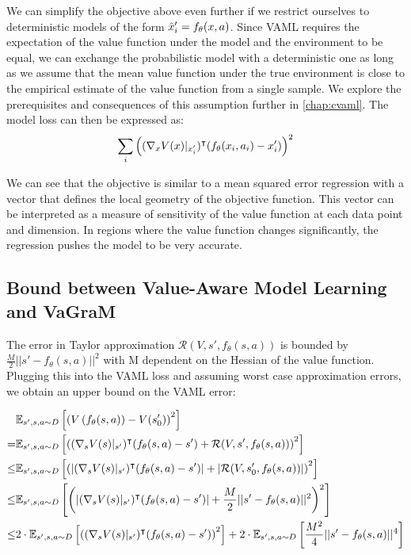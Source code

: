 We can simplify the objective above even further if we restrict ourselves to deterministic models of the form $\hat{x}'_i = f_\theta(x,a)$.
Since VAML requires the expectation of the value function under the model and the environment to be equal, we can exchange the probabilistic model with a deterministic one as long as we assume that the mean value function under the true environment is close to the empirical estimate of the value function from a single sample.
We explore the prerequisites and consequences of this assumption further in \autoref{chap:cvaml}.
The model loss can then be expressed as:
\begin{align}
    \sum_i {\left((\nabla_x V(x)|_{x'_i})^\intercal (f_\theta(x_i,a_i) - x'_i) \right)^2} \label{eq:vagram:taylor_vaml}
\end{align}

We can see that the objective is similar to a mean squared error regression with a vector that defines the local geometry of the objective function. This vector can be interpreted as a measure of sensitivity of the value function at each data point and dimension. In regions where the value function changes significantly, the regression pushes the model to be very accurate. 

\subsection{Bound between Value-Aware Model Learning and VaGraM}
\label{app:taylor_bound}

The error in Taylor approximation $\mathcal{R}(V, s', f_\theta(s,a))$ is bounded by $\frac{M}{2}||s' - f_\theta(s,a)||^2$ with M dependent on the Hessian of the value function. Plugging this into the VAML loss and assuming worst case approximation errors, we obtain an upper bound on the VAML error:

\begin{align*}
    &\mathbb{E}_{s',s,a \sim D}\left[\left(V\left(f_\theta(s,a) \right) - V(s_0')\right)^2\right] \\
    = &\mathbb{E}_{s',s,a \sim D}\left[\left((\nabla_s V(s)|_{s'})^\intercal (f_\theta(s,a) - s') + \mathcal{R}(V, s',f_\theta(s,a))\right)^2\right]\\
    \leq &\mathbb{E}_{s',s,a \sim D}\left[\left(\left|(\nabla_s V(s)|_{s'})^\intercal (f_\theta(s,a) - s')\right| + \left|\mathcal{R}(V, s_0', f_\theta(s,a))\right|\right)^2\right]\\
    \leq &\mathbb{E}_{s',s,a \sim D}\left[{\left(\left|(\nabla_s V(s)|_{s'})^\intercal (f_\theta(s,a) - s')\right| + \frac{M}{2}||s' - f_\theta(s,a)||^2\right)^2}\right]\\
    \leq &2\cdot\mathbb{E}_{s',s,a \sim D}\left[{\left((\nabla_s V(s)|_{s'})^\intercal (f_\theta(s,a) - s')\right)^2}\right] + 2\cdot\mathbb{E}_{s',s,a \sim D}\left[\frac{M^2}{4}||s' - f_\theta(s,a)||^4\right]
\end{align*}

